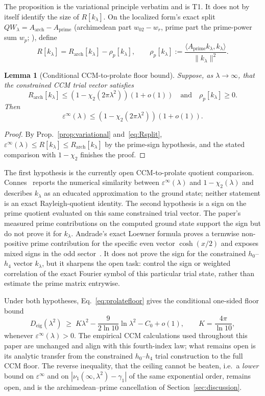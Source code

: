 \documentclass[11pt,a4paper]{article}
\newtheorem{lemma}{Lemma}
\begin{document}
\noindent The proposition is the variational principle verbatim and is T1.
It does not by itself identify the size of $R[k_\lambda]$. On the localized
form's exact split $QW_\lambda=A_{\mathrm{arch}}-A_{\mathrm{prime}}$
(archimedean part $w_{02}-w_r$, prime part the prime-power sum $w_p$;
\cite[\S6]{CCM2025}), define
\begin{equation}\label{eq:Rsplit}
  R[k_\lambda]
   =R_{\mathrm{arch}}[k_\lambda]-\rho_p[k_\lambda],
  \qquad
  \rho_p[k_\lambda]
   :=\frac{\langle A_{\mathrm{prime}}k_\lambda,k_\lambda\rangle}
           {\|k_\lambda\|^2}.
\end{equation}

\begin{lemma}[Conditional CCM-to-prolate floor bound]\label{lem:floorbound}
Suppose, as $\lambda\to\infty$, that the constrained CCM trial vector satisfies
\[
  R_{\mathrm{arch}}[k_\lambda]
  \le (1-\chi_2(2\pi\lambda^2))(1+o(1))
  \quad\text{and}\quad
  \rho_p[k_\lambda]\ge0.
\]
Then
\[
  \varepsilon^\infty(\lambda)
  \le (1-\chi_2(2\pi\lambda^2))(1+o(1)).
\]
\end{lemma}
\begin{proof}
By Prop.~\ref{prop:variational} and~\eqref{eq:Rsplit},
$\varepsilon^\infty(\lambda)\le R[k_\lambda]
\le R_{\mathrm{arch}}[k_\lambda]$ by the prime-sign hypothesis, and the stated
comparison with $1-\chi_2$ finishes the proof.
\end{proof}

\noindent The first hypothesis is the currently open CCM-to-prolate quotient
comparison. Connes~\cite[\S6.4]{Connes2026} reports the numerical similarity
between $\varepsilon^\infty(\lambda)$ and $1-\chi_2(\lambda)$ and describes
$k_\lambda$ as an educated approximation to the ground state; neither statement
is an exact Rayleigh-quotient identity. The second hypothesis is a sign on the
prime quotient evaluated on this same constrained trial vector. The paper's
measured prime contributions on the computed ground state support the sign but
do not prove it for $k_\lambda$.
Andrade's exact Loewner formula proves a termwise non-positive prime
contribution for the specific even vector $\cosh(x/2)$ and exposes mixed signs
in the odd sector~\cite{AndradePrime2026}. It does not prove the sign for the
constrained $h_0$--$h_4$ vector $k_\lambda$, but it sharpens the open task:
control the sign or weighted correlation of the exact Fourier symbol of this
particular trial state, rather than estimate the prime matrix entrywise.

Under both hypotheses, Eq.~\eqref{eq:prolatefloor} gives the conditional
one-sided floor bound
\[
  D_{\mathrm{eig}}(\lambda^2)\;\ge\;K\lambda^2-\frac{9}{2\ln10}\ln\lambda^2
  -C_0+o(1),\qquad K=\frac{4\pi}{\ln10},
\]
whenever $\varepsilon^\infty(\lambda)>0$. The empirical CCM calculations used
throughout this paper are unchanged and align with this fourth-index law; what
remains open is its analytic transfer from the constrained $h_0$--$h_4$ trial
construction to the full CCM floor. The reverse inequality,
that the ceiling cannot be beaten, i.e.\ a \emph{lower} bound on
$\varepsilon^\infty$ and on $|\nu_1(\infty,\lambda^2)-\gamma_1|$ of the same
exponential order, remains open, and is the archimedean--prime cancellation
of Section~\ref{sec:discussion}.
\end{document}
